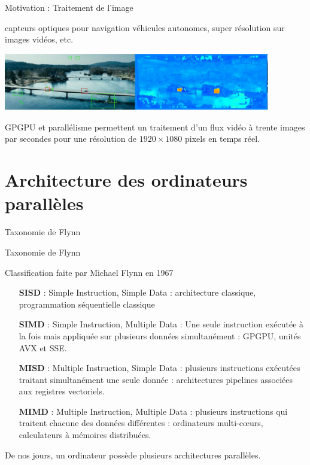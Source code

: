 \documentclass[handout]{beamer}
\begin{document}
\begin{frame}[fragile]{Motivation : Traitement de l'image}

capteurs optiques pour navigation véhicules autonomes, super résolution
sur images vidéos, etc.

\center\includegraphics[height=2.5cm]{fluxvideo}

GPGPU et parallélisme permettent un traitement d'un flux vidéo à trente images par secondes
pour une résolution de $1920\times 1080$ pixels en temps réel.

\end{frame}

\section{Architecture des ordinateurs parallèles}

\begin{frame}[fragile]{Taxonomie de Flynn}
 
\begin{block}{Taxonomie de Flynn}
 
Classification faite par Michael Flynn en 1967

\begin{itemize}
\item[\textbf{SISD}] : Simple Instruction, Simple Data : architecture classique, programmation séquentielle
  classique
\item[\textbf{SIMD}] : Simple Instruction, Multiple Data : Une seule instruction exécutée à la fois mais
	        appliquée sur plusieurs données simultanément : GPGPU, unités  AVX et SSE.
\item[\textbf{MISD}] : Multiple Instruction, Simple Data : plusieurs instructions exécutées traitant simultanément
                une seule donnée : architectures pipelines associées aux registres vectoriels.
\item[\textbf{MIMD}] : Multiple Instruction, Multiple Data : plusieurs instructions qui traitent chacune des données
  différentes : ordinateurs multi-c{\oe}urs, calculateurs à mémoires distribuées.
\end{itemize}
\end{block}

De nos jours, un ordinateur possède plusieurs architectures parallèles.

\end{frame}
\end{document}
